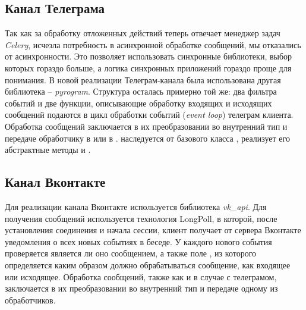     \subsection{Канал Телеграма}
    Так как за обработку отложенных действий теперь отвечает менеджер задач \textit{Celery},
    исчезла потребность в асинхронной обработке сообщений, мы отказались от асинхронности.
    Это позволяет использовать синхронные библиотеки, выбор которых гораздо больше,
    а логика синхронных приложений гораздо проще для понимания.
    В новой реализации Телеграм-канала была использована другая библиотека -- \textit{pyrogram}\cite{docs.pyrogram}.
    Структура  осталась примерно той же: два фильтра событий и две функции, описывающие
    обработку входящих и исходящих сообщений подаются в цикл обработки событий (\textit{event loop})
    телеграм клиента.
    Обработка сообщений заключается в их преобразовании во внутренний тип 
    и передаче обработчику в  или в .
     наследуется от базового класса ,
    реализует его абстрактные методы  и .

    \subsection{Канал Вконтакте}
    Для реализации канала Вконтакте используется
    библиотека \textit{vk\_api}\cite{docs.vkapi}.
    Для получения сообщений используется технология LongPoll, в которой, после
    установления соединения и начала сессии, клиент получает
    от сервера Вконтакте уведомления о всех новых событиях в беседе.
    У каждого нового события проверяется
    является ли оно сообщением, а также поле , из которого определяется каким образом
    должно обрабатываться сообщение, как входящее или исходящее.
    Обработка сообщений, также как и в случае с телеграмом, заключается в их преобразовании во внутренний тип
    и передаче одному из обработчиков.

